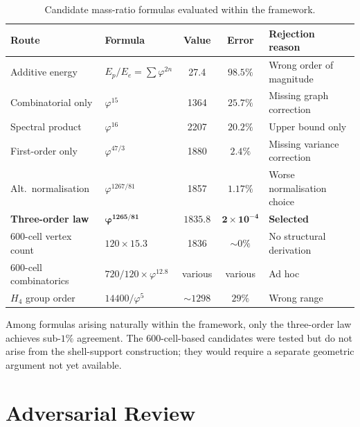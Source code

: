\documentclass[12pt]{article}
\newcommand{\phig}{\varphi}
\begin{document}
\begin{table}[ht]
\centering
\caption{Candidate mass-ratio formulas evaluated within the framework.}
\label{tab:rejected}
\begin{tabular}{@{}llccl@{}}
\toprule
Route & Formula & Value & Error & Rejection reason \\
\midrule
Additive energy & $E_p/E_e = \sum \phig^{2n}$ & 27.4 & $98.5\%$ & Wrong order of magnitude \\
Combinatorial only & $\phig^{15}$ & 1364 & $25.7\%$ & Missing graph correction \\
Spectral product & $\phig^{16}$ & 2207 & $20.2\%$ & Upper bound only \\
First-order only & $\phig^{47/3}$ & 1880 & $2.4\%$ & Missing variance correction \\
Alt.\ normalisation & $\phig^{1267/81}$ & 1857 & $1.17\%$ & Worse normalisation choice \\
\textbf{Three-order law} & $\boldsymbol{\phig^{1265/81}}$ & $\boldsymbol{1835.8}$ & $\boldsymbol{2 \times 10^{-4}}$ & \textbf{Selected} \\
600-cell vertex count & $120 \times 15.3$ & 1836 & $\sim 0\%$ & No structural derivation \\
600-cell combinatorics & $720/120 \times \phig^{12.8}$ & various & various & Ad hoc \\
$H_4$ group order & $14400/\phig^5$ & $\sim 1298$ & $29\%$ & Wrong range \\
\bottomrule
\end{tabular}
\end{table}

Among formulas arising naturally within the framework, only the three-order law achieves sub-$1\%$ agreement. The 600-cell-based candidates were tested but do not arise from the shell-support construction; they would require a separate geometric argument not yet available.

\section{Adversarial Review}\label{app:adversarial}
\end{document}
